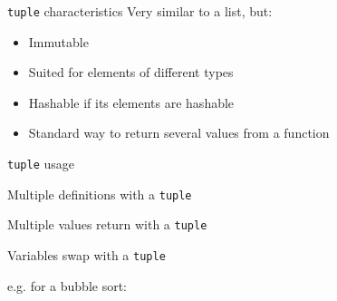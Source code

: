 \begin{frame}{\texttt{tuple} characteristics}
  Very similar to a list, but:

  \begin{itemize}
    \item Immutable
    \item Suited for elements of different types
    \item Hashable if its elements are hashable
    \item Standard way to return several values from a function
  \end{itemize}
\end{frame}

\begin{frame}{\texttt{tuple} usage}
\end{frame}

\begin{frame}{Multiple definitions with a \texttt{tuple}}
\end{frame}

\begin{frame}{Multiple values return with a \texttt{tuple}}
\end{frame}

\begin{frame}{Variables swap with a \texttt{tuple}}

  e.g. for a bubble sort:

\end{frame}
